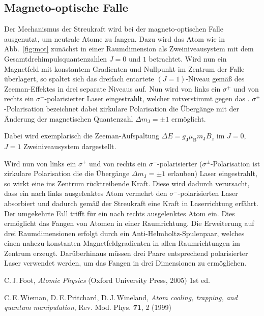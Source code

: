 \documentclass[twocolumn]{revtex4}
\begin{document}
\subsection{Magneto-optische Falle}
Der Mechanismus der Streukraft wird bei der magneto-optischen Falle ausgenutzt, um neutrale Atome zu fangen.
Dazu wird das Atom wie in Abb.~\ref{fig:mot} zunächst in einer Raumdimension als Zweiniveausystem mit dem Gesamtdrehimpulsquantenzahlen $J=0$ und $1$ betrachtet.
Wird nun ein Magnetfeld mit konstantem Gradienten und Nullpunkt im Zentrum der Falle überlagert, so spaltet sich das dreifach entartete $(J=1)$-Niveau gemäß des Zeeman-Effektes in drei separate Niveaus auf.
Nun wird von links ein $\sigma^+$ und von rechts ein $\sigma^-$-polarisierter Laser eingestrahlt, welcher rotverstimmt gegen das .
$\sigma^\pm$-Polarisation bezeichnet dabei zirkulare Polarisation die Übergänge mit der Änderung der magnetischen Quantenzahl $\Delta m_\mathrm{J} = \pm 1$ ermöglicht.


Dabei wird exemplarisch die Zeeman-Aufspaltung $\Delta E = g_\mathrm{J} \mu_\mathrm{B} m_\mathrm{J} B_z$ im $J=0$, $J=1$ Zweiniveausystem dargestellt.

Wird nun von links ein $\sigma^+$ und von rechts ein $\sigma^-$-polarisierter ($\sigma^\pm$-Polarisation ist zirkulare Polarisation die die Übergänge $\Delta m_\mathrm{J} = \pm 1$ erlauben) Laser eingestrahlt, so wirkt eine ins Zentrum rücktreibende Kraft.
Diese wird dadurch verursacht, dass ein nach links ausgelenktes Atom vermehrt den $\sigma^-$-polarisierten Laser absorbiert und dadurch gemäß der Streukraft eine Kraft in Laserrichtung erfährt.
Der umgekehrte Fall trifft für ein nach rechts ausgelenktes Atom ein.
Dies ermöglicht das Fangen von Atomen in einer Raumrichtung.
Die Erweiterung auf drei Raumdimensionen erfolgt durch ein Anti-Helmholtz-Spulenpaar, welches einen nahezu konstanten Magnetfeldgradienten in allen Raumrichtungen im Zentrum erzeugt.
Darüberhinaus müssen drei Paare  entsprechend polarisierter Laser verwendet werden, um das Fangen in drei Dimensionen zu ermöglichen.


\begin{thebibliography}{}
C.\,J.\,Foot, {\it Atomic Physics} (Oxford University Press, 2005) 1st ed.

C.\,E.\,Wieman, D.\,E.\,Pritchard, D.\,J.\,Wineland, {\it Atom cooling, trapping, and quantum manipulation}, Rev. Mod. Phys. \textbf{71}, 2 (1999)

\end{thebibliography}
\end{document}

